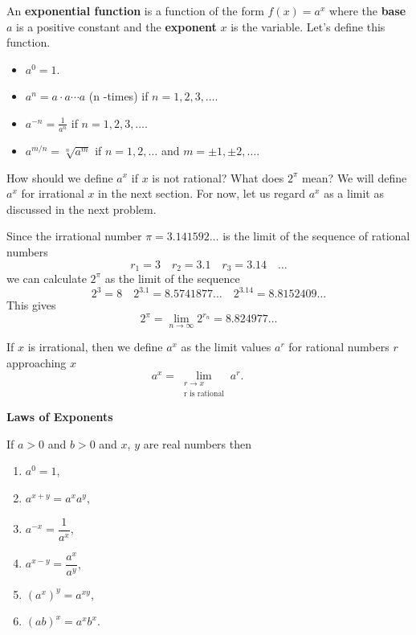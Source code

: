 \documentclass[../calc1-main.tex]{subfiles}
\begin{document}
  An \textbf{exponential function} is a function of the form $f(x) = a^x$ where the \textbf{base} $a$ is a positive constant and the \textbf{exponent} $x$ is the variable. Let's define this function.

  \begin{itemize}
    \item $a^0 = 1$.
    \item $a^n = a \cdot a \cdots a$ (n -times) if $n = 1, 2, 3, \dots$.
    \item $a^{-n} = \frac{1}{a^n}$ if $n=1, 2, 3, \dots$.
    \item $a^{m/n} = \sqrt[n]{a^m}$ if $n=1, 2, \dots$ and $m = \pm 1, \pm 2, \dots$.
  \end{itemize}

  How should we define $a^x$ if $x$ is not rational? What does $2^{\pi}$ mean? We will define $a^x$ for irrational $x$ in the next section. For now, let us regard $a^x$ as a limit as discussed in the next problem.

  \begin{example}
    Since the irrational number $\pi = 3.141592\dots$ is the limit of the sequence of rational numbers
    \[
      r_1 = 3 \quad r_2 = 3.1 \quad r_3 = 3.14 \quad \dots
    \]
    we can calculate $2^{\pi}$ as the limit of the sequence
    \[
      2^3 = 8 \quad 2^{3.1} = 8.5741877\dots \quad 2^{3.14} = 8.8152409\dots
    \]
    This gives
    \[
      2^{\pi} = \lim_{n \to \infty} 2^{r_n} = 8.824977\dots
    \]
  \end{example}
  If $x$ is irrational, then we define $a^x$ as the limit values $a^r$ for rational numbers $r$ approaching $x$
  \[
    a^x = \lim_{\substack{r \to x \\ \text{r is rational}}} a^r. \qquad
  \]

  \textbf{Laws of Exponents}

  If $a>0$ and $b>0$ and $x$, $y$ are real numbers then
  \begin{multicols}{2}
    \begin{enumerate}
      \item $a^{0} = 1$,
      \item $a^{x+y} = a^x a^y$,
      \item $a^{-x} = \dfrac{1}{a^x}$,
      \item $a^{x-y} = \dfrac{a^x}{a^y}$,
      \item $(a^x)^y = a^{xy}$,
      \item $(ab)^x = a^x b^x$.
    \end{enumerate}
  \end{multicols}
\end{document}

